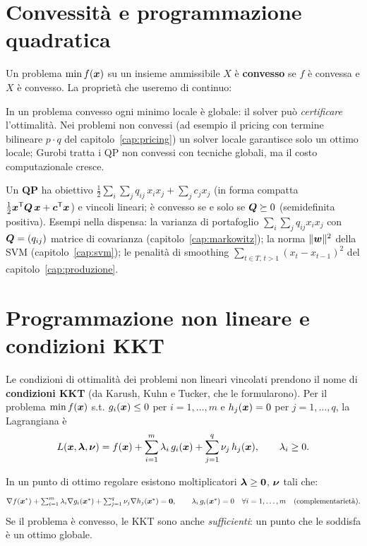 \section{Convessità e programmazione quadratica}

Un problema $\min f(\boldsymbol{x})$ su un insieme ammissibile $X$ è \textbf{convesso} se $f$ è
convessa e $X$ è convesso. La proprietà che useremo di continuo:

\begin{insight}
In un problema convesso ogni minimo locale è globale: il solver può \emph{certificare}
l'ottimalità. Nei problemi non convessi (ad esempio il pricing con termine bilineare
$p\cdot q$ del capitolo~\ref{cap:pricing}) un solver locale garantisce solo un ottimo
locale; Gurobi tratta i QP non convessi con tecniche globali, ma il costo computazionale
cresce.
\end{insight}

Un \textbf{QP} ha obiettivo $\tfrac12 \sum_{i}\sum_{j} q_{ij}\, x_i x_j + \sum_j c_j x_j$ (in forma compatta $\tfrac12 \boldsymbol{x}^{\mathsf T} \boldsymbol{Q}\, \boldsymbol{x} + \boldsymbol{c}^{\mathsf T} \boldsymbol{x}$) e vincoli lineari; è convesso se
e solo se $\boldsymbol{Q} \succeq 0$ (semidefinita positiva). Esempi nella dispensa: la varianza di
portafoglio $\sum_i\sum_j q_{ij} x_i x_j$ con $\boldsymbol{Q} = (q_{ij})$ matrice di covarianza (capitolo~\ref{cap:markowitz});
la norma $\|\boldsymbol{w}\|^2$ della SVM (capitolo~\ref{cap:svm}); le penalità di smoothing
$\sum_{t \in T,\, t > 1} (x_t - x_{t-1})^2$ del capitolo~\ref{cap:produzione}.

\section{Programmazione non lineare e condizioni KKT}

Le condizioni di ottimalità dei problemi non lineari vincolati prendono il nome di
\textbf{condizioni KKT} (da Karush, Kuhn e Tucker, che le formularono).
Per il problema $\min f(\boldsymbol{x})$ s.t. $g_i(\boldsymbol{x}) \le 0$ per $i = 1, \dots, m$ e $h_j(\boldsymbol{x}) = 0$ per $j = 1, \dots, q$, la Lagrangiana è
\[
L(\boldsymbol{x}, \boldsymbol{\lambda}, \boldsymbol{\nu}) = f(\boldsymbol{x}) + \sum_{i=1}^{m} \lambda_i\, g_i(\boldsymbol{x}) + \sum_{j=1}^{q} \nu_j\, h_j(\boldsymbol{x}),
\qquad \lambda_i \ge 0 .
\]

\begin{modello}
In un punto di ottimo regolare esistono moltiplicatori $\boldsymbol{\lambda} \ge \boldsymbol{0}$, $\boldsymbol{\nu}$ tali che:
\[
\nabla f(\boldsymbol{x}^*) + \textstyle\sum_{i=1}^{m} \lambda_i \nabla g_i(\boldsymbol{x}^*) + \sum_{j=1}^{q} \nu_j \nabla h_j(\boldsymbol{x}^*) = \boldsymbol{0},
\qquad
\lambda_i\, g_i(\boldsymbol{x}^*) = 0 \quad \forall i = 1, \dots, m \quad\text{(complementarietà)}.
\]
Se il problema è convesso, le KKT sono anche \emph{sufficienti}: un punto che le
soddisfa è un ottimo globale.
\end{modello}


